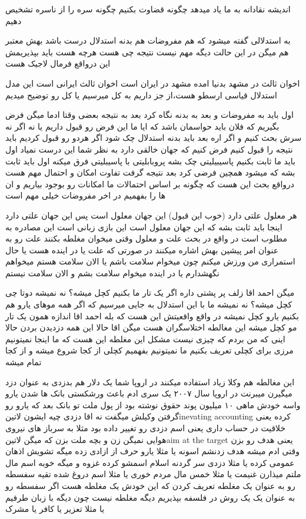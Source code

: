 \documentclass{article}
\begin{document}
		 اندیشه نقادانه به ما یاد میدهد چگونه قضاوت بکنیم چگونه سره را از ناسره تشخیص دهیم
		
		 به استدلالی گفته میشود که هم مفروضات هم بدنه استدلال درست باشد بهش معتبر هم میگن در این حالت 
		دیگه مهم نیست نتیجه چی هست هرچه هست باید بپذیریمش این درواقع فرمال لاجیک هست
		
		 اخوان ثالث در مشهد بدنیا امده مشهد در ایران است اخوان ثالث ایرانی است این مدل استدلال قیاسی ارسطو هست،‌از جز داریم
		به کل میرسیم یا کل رو توضیح میدیم
		
		 اول باید به مفروضات و بعد به بدنه نگاه کرد بعد به نتیجه بعضی وقتا ادما میگن فرض بگیریم که فلان باید حواسمان
		باشد که ایا ما این فرض رو قبول داریم یا نه اگر نه سرش بحث کنیم و اگر اره بعد باید بدنه استدلال چک شود اگر هردو رو قبول کردیم باید
		نتیجه را قبول کنیم 
		 فرض کنیم که جهان خالقی دارد به نظر شما این درست نمیاد اول باید ما ثابت بکنیم پاسیبیلیتی چک بشه پروبابلیتی با 
		پاسیبلیتی فرق میکنه اول باید ثابت بشه که میشود همچین فرضی کرد بعد نتیجه گرفت تفاوت امکان و احتمال مهم هست درواقع بحث این هست 
		که چگونه بر اساس احتمالات ما امکانات رو بوجود بیاریم و ان ها را بفهمیم در اخر مفروضات خیلی مهم است
		
		 هر معلول علتی دارد (خوب این قبول) این جهان معلول است پس این جهان علتی دارد اینجا باید ثابت بشه که این 
		جهان معلول است این بازی زبانی است این مصادره به مطلوب است در واقع در بحث علت و معلول وقتی میخوان مغلطه بکنند علت رو به عنوان 
		امر پیشین بهش اشاره میکنند در صورتی که علت یا در اینده هست یا حال استمراری من ورزش میکنم چون میخوام سلامت باشم یا الان سلامت هستم
		میخواهم نگهشدارم یا در اینده میخوام سلامت بشم و الان سلامت نیستم
		
		 میگن احمد اقا زلف پر پشتی داره اگر یک تار ما بکنیم کچل میشه؟ نه نمیشه دوتا چی کچل میشه؟ نه نمیشه ما با
		این استدلال به جایی میرسیم که اگر همه موهای یارو هم بکنیم یارو کچل نمیشه در واقع واقعیتش این هست که بله احمد اقا اندازه همون 
		یک تار مو کچل میشه این مغالطه اختلاسگران هست میگن اقا حالا این همه دزدیدن بردن حالا اینی که من بردم که چیزی نیست مشکل این مغلطه این 
		هست که ما اینجا نمیتونیم مرزی برای کچلی تعریف بکنیم ما نمیتونیم بفهمیم کچلی از کجا شروع میشه و از کجا تمام میشه 
		
		 این مغالطه هم وکلا زیاد استفاده میکنند در اروپا شما یک دلار هم بدزدی به عنوان دزد میگیرن میبرنت در اروپا 
		سال ۲۰۰۷ یک سری ادم باعث ورشکستی بانک ها شدن یارو واسه خودش ماهی ۱۰ میلیون پوند حقوق نوشته بود از پول ملت تو بانک بعد که یارو رو 
		گرفتن وکیلش میگفت نه اقا دزدی چیه ایشون ‌لاتین{inevating accounting} کرده یعنی خلاقیت در حساب داری یعنی اسم دزدی رو تغییر داده 
		بود مثلا به سرباز های نیروی هوایی نمیگن زن و بچه ملت بزن که میگن ‌لاتین{aim at the target} یعنی هدف رو بزن وقتی ادم میشه هدف
		زدنشم اسونه یا مثلا یارو حرف از ازادی زده میگه تشویش اذهان عمومی کرده یا مثلا دزدی سر گردنه اسلام اسمشو کرده غزوه و میگه خوبه اسم
		مال ملتم میذارن غنیمت یا مثلا خمس مال مردم خوری یا مثلا اسم دروغ شده تقیه 
		 سفسطه رو به عنوان یک مغلطه تعریف کردن که این خودش یک مغلطه هست اگر سفسطه رو به عنوان یک یک روش در فلسفه بپذیریم
		دیگه مغلطه نیست چون دیگه با زبان طرفیم یا مثلا تعزیر یا کافر یا مشرک
		
\end{document}
